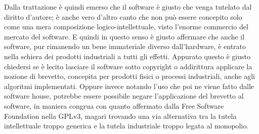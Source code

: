 Dalla trattazione è quindi emerso che il software è giusto che venga tutelato dal diritto d'autore; è anche vero d'altro canto che non può essere concepito solo come una mera composizione logico-intellettuale, visto l'enorme commercio del mercato del software. E quindi in questo senso è giusto affermare che anche il software, pur rimanendo un bene immateriale diverso dall'hardware, è entrato nella schiera dei prodotti industriali a tutti gli effetti. Appurato questo è giusto chiedersi se è lecito lasciare il software sotto copyright o addirittura applicare la nozione di brevetto, concepita per prodotti fisici o processi industriali, anche agli algoritmi implementati. Oppure invece notando l'uso che poi ne viene fatto dalle software house, potrebbe essere possibile negare l'applicazione del brevetto al software, in maniera congrua con quanto affermato dalla Free Software Foundation nella GPLv3, magari trovando una via alternativa tra la tutela intellettuale troppo generica e la tutela industriale troppo legata al monopolio.
